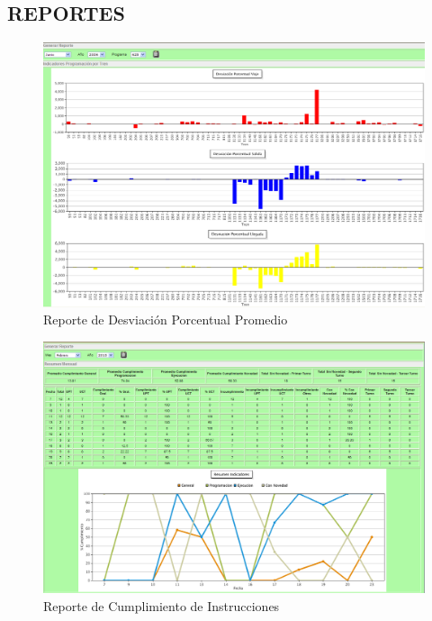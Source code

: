 \documentclass[oneside,12pt, letterpaper, titlepage]{book}
\begin{document}
\begin{appendices}
\chapter[Reportes]{REPORTES}
\begin{figure}[H]
    \centering
    \includegraphics[scale=0.35]{./images/ReporteDesviacionKPI}
    \caption{Reporte de Desviación Porcentual Promedio}
    \label{fig:DPPKPI}
\end{figure}

\begin{figure}[H]
    \centering
    \includegraphics[scale=0.35]{./images/ReporteInstruccionesKPI}
    \caption{Reporte de Cumplimiento de Instrucciones}
    \label{fig:RIKPI}
\end{figure}


\end{appendices}
\end{document}
